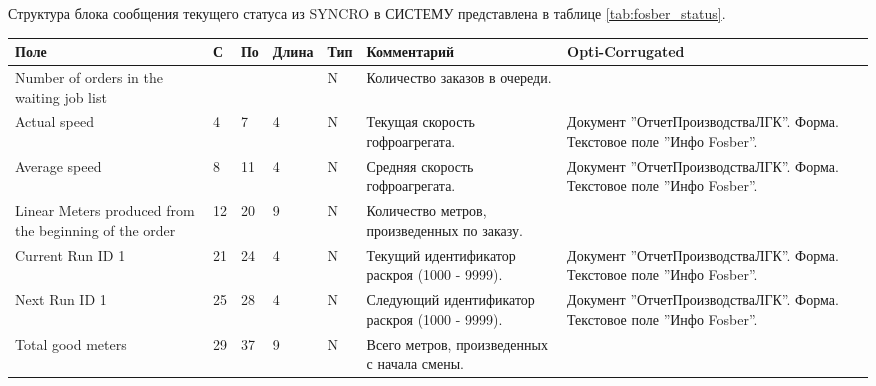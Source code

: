 \scriptsize
\begin{landscape}
Структура блока сообщения текущего статуса из SYNCRO в СИСТЕМУ представлена в таблице \ref{tab:fosber_status}.
\scriptsize

\begin{longtable}{|p{45mm}|p{6mm}|p{6mm}|p{8mm}|p{6mm}|p{70mm}|p{80mm}|}
\hline
\parbox[c][10mm]{45mm}{\centering Поле} & \parbox{6mm}{\centering С} & \parbox{6mm}{\centering По} & \parbox{8mm}{\centering Длина} & \parbox{5mm}{\centering Тип} & \parbox{70mm}{\centering Комментарий}  & \parbox{80mm}{\centering Opti-Corrugated} \\
\hline
\parbox[c][12mm]{45mm}{\raggedright Number of orders in the waiting job list} & \parbox[c]{9mm}{} & \parbox[c]{9mm}{} & \parbox[c]{11mm}{} & \parbox[c]{10mm}{\centering N} & \parbox[c]{80mm}{\raggedright Количество заказов в очереди.} & \parbox[c]{80mm}{\raggedright} \\
\hline
\parbox[c][10mm]{45mm}{Actual speed} & \parbox{9mm}{4} & \parbox{9mm}{7} & \parbox{11mm}{4} & \parbox{10mm}{N} & \parbox{70mm}{Текущая скорость гофроагрегата.} & \parbox{80mm}{Документ ''ОтчетПроизводстваЛГК''. Форма. Текстовое поле ''Инфо Fosber''.} \\
\hline
\parbox[c][10mm]{45mm}{Average speed} & \parbox{9mm}{8} & \parbox{9mm}{11} & \parbox{11mm}{4} & \parbox{10mm}{N} & \parbox{70mm}{Средняя скорость гофроагрегата.} & \parbox{80mm}{Документ ''ОтчетПроизводстваЛГК''. Форма. Текстовое поле ''Инфо Fosber''.} \\
\hline
\parbox[c][13mm]{45mm}{Linear Meters produced from the beginning of the order} & \parbox{9mm}{12} & \parbox{9mm}{20} & \parbox{11mm}{9} & \parbox{10mm}{N} & \parbox{70mm}{Количество метров, произведенных по заказу.} & \parbox{50mm}{} \\
\hline
\parbox[c][10mm]{45mm}{Current Run ID 1} & \parbox{9mm}{21} & \parbox{9mm}{24} & \parbox{11mm}{4} & \parbox{10mm}{N} & \parbox{70mm}{Текущий идентификатор раскроя (1000 - 9999).} & \parbox{80mm}{Документ ''ОтчетПроизводстваЛГК''. Форма. Текстовое поле ''Инфо Fosber''.} \\
\hline
\parbox[c][10mm]{45mm}{Next Run ID 1} & \parbox{9mm}{25} & \parbox{9mm}{28} & \parbox{11mm}{4} & \parbox{10mm}{N} & \parbox{70mm}{Следующий идентификатор раскроя (1000 - 9999).} & \parbox{80mm}{Документ ''ОтчетПроизводстваЛГК''. Форма. Текстовое поле ''Инфо Fosber''.} \\
\hline
\parbox[c][5mm]{45mm}{Total good meters} & \parbox{9mm}{29} & \parbox{9mm}{37} & \parbox{11mm}{9} & \parbox{10mm}{N} & \parbox{70mm}{Всего метров, произведенных с начала смены.} & \parbox{80mm}{} \\

\end{longtable}
\end{landscape}
